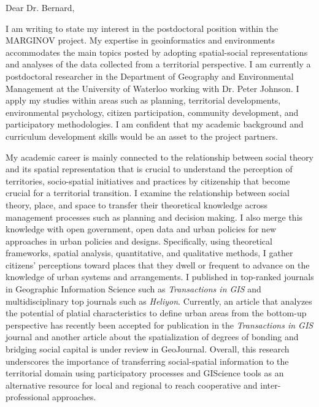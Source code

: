 


Dear Dr. Bernard,


I am writing to state my interest in the postdoctoral position within the MARGINOV project. My expertise in geoinformatics and environments accommodates the main topics posted by adopting spatial-social representations and analyses of the data collected from a territorial perspective. I am currently a postdoctoral researcher in the Department of Geography and Environmental Management at the University of Waterloo working with Dr. Peter Johnson. I apply my studies within areas such as planning, territorial developments, environmental psychology, citizen participation, community development, and participatory methodologies. I am confident that my academic background and curriculum development skills would be an asset to the project partners.


My academic career is mainly connected to the relationship between social theory and its spatial representation that is crucial to understand the perception of territories, socio-spatial initiatives and practices by citizenship that become crucial for a territorial transition. I examine the relationship between social theory, place, and space to transfer their theoretical knowledge across management processes such as planning and decision making. I also merge this knowledge with open government, open data and urban policies for new approaches in urban policies and designs. Specifically, using theoretical frameworks, spatial analysis, quantitative, and qualitative methods, I gather citizens’ perceptions toward places that they dwell or frequent to advance on the knowledge of urban systems and arrangements. I published in top-ranked journals in Geographic Information Science such as \textit{Transactions in GIS} and multidisciplinary top journals such as \textit{Heliyon}. Currently, an article that analyzes the potential of platial characteristics to define urban areas from the bottom-up perspective has recently been accepted for publication in the \textit{Transactions in GIS} journal and another article about the spatialization of degrees of bonding and bridging social capital is under review in GeoJournal. Overall, this research underscores the importance of transferring social-spatial information to the territorial domain using participatory processes and GIScience tools as an alternative resource for local and regional to reach cooperative and inter-professional approaches.\par

